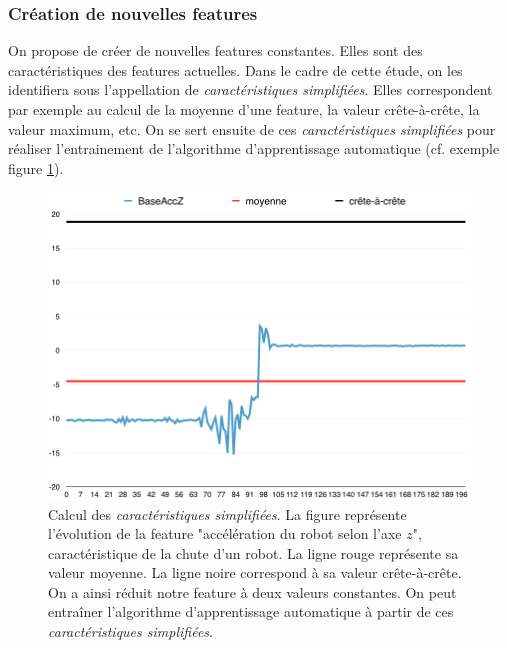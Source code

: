 \subsubsection{Création de nouvelles features}
\label{Automatisation du processus d'investigation: Reconnaissance de motifs: Différentes approches étudiées: Création de nouvelles features}
On propose de créer de nouvelles features constantes. Elles sont des caractéristiques des features actuelles. Dans le cadre de cette étude, on les identifiera sous l'appellation de \emph{caractéristiques simplifiées}. Elles correspondent par exemple au calcul de la moyenne d'une feature, la valeur crête-à-crête, la valeur maximum, etc. On se sert ensuite de ces  \emph{caractéristiques simplifiées} pour réaliser l'entrainement de l'algorithme d'apprentissage automatique (cf. exemple figure \ref{fig:Calcul de nouvelles features}).

\begin{figure}[H]
	\centering\includegraphics[width=12cm]{images/caracteristiques_simples_1.png}
	\caption[Calcul des caractéristiques simplifiées]{Calcul des \emph{caractéristiques simplifiées}. La figure représente l'évolution de la feature "accélération du robot selon l'axe $z$",  caractéristique de la chute d'un robot. La ligne rouge représente sa valeur moyenne. La ligne noire correspond à sa valeur crête-à-crête. On a ainsi réduit notre feature à deux valeurs constantes. On peut  entraîner l'algorithme d'apprentissage automatique à partir de ces \emph{caractéristiques simplifiées}.}
	\label{fig:Calcul de nouvelles features}
\end{figure}

